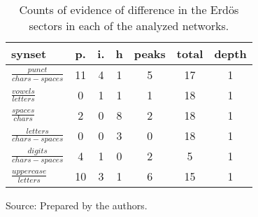 \begin{table}[h!]
\begin{center}
\caption{Counts of evidence of difference in the Erd\"os sectors in each of the analyzed networks.}
	\def\arraystretch{1.5}
\begin{tabular}{| l || c | c | c || c | c | c |}\hline
{\bf synset} & {\bf p.} & {\bf i.} & {\bf h} & {\bf peaks} & {\bf total} & {\bf depth} \\\hline\hline
$\frac{punct}{chars-spaces}$ & 11  & 4  & 1  & 5  & 17  & 1 \\\hline
$\frac{vowels}{letters}$ & 0  & 1  & 1  & 1  & 18  & 1 \\\hline
$\frac{spaces}{chars}$ & 2  & 0  & 8  & 2  & 18  & 1 \\\hline
$\frac{letters}{chars-spaces}$ & 0  & 0  & 3  & 0  & 18  & 1 \\\hline
$\frac{digits}{chars-spaces}$ & 4  & 1  & 0  & 2  & 5  & 1 \\\hline
$\frac{uppercase}{letters}$ & 10  & 3  & 1  & 6  & 15  & 1 \\\hline
\end{tabular}
\begin{flushleft}
		Source: Prepared by the authors.\
\end{flushleft}
\end{center}
\end{table}
